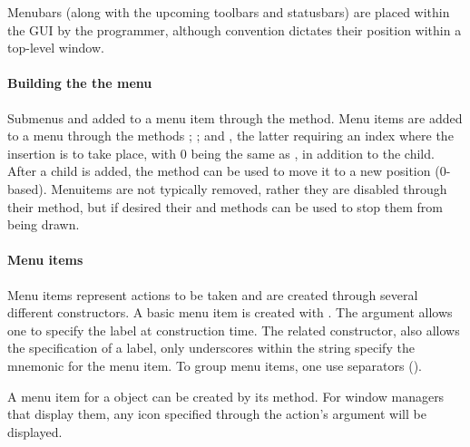 Menubars (along with the upcoming toolbars and statusbars) are placed
within the GUI by the programmer, although convention dictates their
position within a top-level window.


\paragraph{Building the the menu}
Submenus and added to a menu item through the
 method. Menu items are added to a
menu through the methods
; ; and
, the latter requiring an index where the
insertion is to take place, with 0 being the same as ,
in addition to the child. After a child is added, the method
 can be used to move it to a new
position ($0$-based). Menuitems are not typically removed, rather they
are disabled through their  method, but if desired
their  and  methods
can be used to stop them from being drawn.


\paragraph{Menu items}
Menu items represent actions to be taken and are created through
several different constructors.  A basic menu item is created with
. The argument 
allows one to specify the label at construction time. The related
constructor,  also allows the
specification of a label, only underscores within the string specify
the mnemonic for the menu item.  To group menu items, one use
separators ().

A menu item for a  object can be created by its
 method. For window managers that
display them, any icon specified through the action's 
argument will be displayed.


